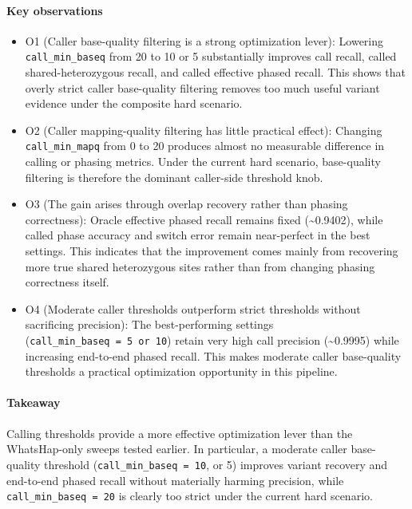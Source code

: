 \documentclass[
]{article}
\begin{document}
\paragraph{Key observations}\label{key-observations-9}

\begin{itemize}
\item
  O1 (Caller base-quality filtering is a strong optimization lever):
  Lowering \texttt{call\_min\_baseq} from 20 to 10 or 5 substantially
  improves call recall, called shared-heterozygous recall, and called
  effective phased recall. This shows that overly strict caller
  base-quality filtering removes too much useful variant evidence under
  the composite hard scenario.
\item
  O2 (Caller mapping-quality filtering has little practical effect):
  Changing \texttt{call\_min\_mapq} from 0 to 20 produces almost no
  measurable difference in calling or phasing metrics. Under the current
  hard scenario, base-quality filtering is therefore the dominant
  caller-side threshold knob.
\item
  O3 (The gain arises through overlap recovery rather than phasing
  correctness): Oracle effective phased recall remains fixed
  (\textasciitilde0.9402), while called phase accuracy and switch error
  remain near-perfect in the best settings. This indicates that the
  improvement comes mainly from recovering more true shared heterozygous
  sites rather than from changing phasing correctness itself.
\item
  O4 (Moderate caller thresholds outperform strict thresholds without
  sacrificing precision): The best-performing settings
  (\texttt{call\_min\_baseq\ =\ 5\ or\ 10}) retain very high call
  precision (\textasciitilde0.9995) while increasing end-to-end phased
  recall. This makes moderate caller base-quality thresholds a practical
  optimization opportunity in this pipeline.
\end{itemize}

\paragraph{Takeaway}\label{takeaway-9}

Calling thresholds provide a more effective optimization lever than the
WhatsHap-only sweeps tested earlier. In particular, a moderate caller
base-quality threshold (\texttt{call\_min\_baseq\ =\ 10}, or 5) improves
variant recovery and end-to-end phased recall without materially harming
precision, while \texttt{call\_min\_baseq\ =\ 20} is clearly too strict
under the current hard scenario.
\end{document}
